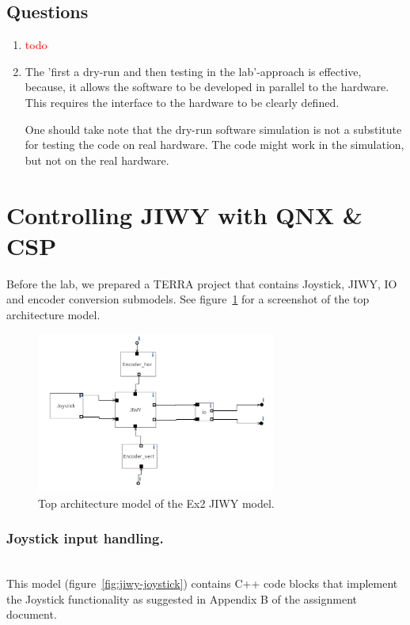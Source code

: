 \documentclass[a4paper,twoside,11pt]{article}
\newcommand{\todo}[1]{{\Large\sc\textcolor{red}{#1}}}
\begin{document}
\subsection{Questions}
\begin{enumerate}
 \item \todo{todo}
 \item The 'first a dry-run and then testing in the lab'-approach is effective, because, it allows the software to be developed in parallel to the hardware.
	 This requires the interface to the hardware to be clearly defined.
	 \smallskip

	 One should take note that the dry-run software simulation is not a 
	 substitute for testing the code on real hardware.
	 The code might work in the simulation, but not on the real hardware.
\end{enumerate}

\newpage

\section{Controlling JIWY with QNX \& CSP}
Before the lab, we prepared a TERRA project that contains Joystick, JIWY, IO and 
encoder conversion submodels. See figure~\ref{fig:jiwy-overview} for a screenshot of the top architecture model.
\begin{figure}[h]
	\centering
	\includegraphics[width=0.7\textwidth]{./img/jiwy-overview.png}
	\caption{Top architecture model of the Ex2 JIWY model.}
	\label{fig:jiwy-overview}
\end{figure}
\subsubsection{Joystick input handling.} \\
This model (figure~\ref{fig:jiwy-joystick}) contains C++ code blocks that implement the Joystick 
functionality as suggested in Appendix B of the assignment document.
\end{document}
